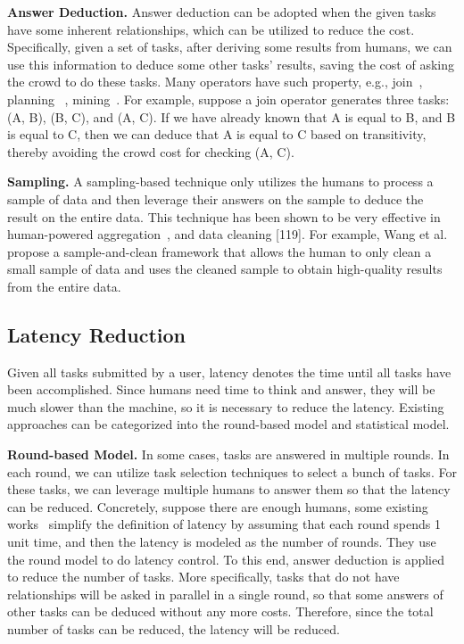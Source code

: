  
\textbf{Answer Deduction.}%
Answer deduction can be adopted when the given tasks have some inherent relationships, which can be utilized to  reduce the cost. Specifically, given a set of tasks, after deriving some  results from  humans, we can use this information to deduce some other tasks’ results, saving the cost of asking the crowd to do these tasks. Many operators have such property, e.g., join~\cite{DBLP:transitivity, DBLP:journals/vldb/ChaiLLDF18, DBLP:conf/sigmod/ChaiLLDF16}, planning ~\cite{DBLP:journals/pvldb/KaplanLMN13, DBLP:journals/pvldb/ZhangTC14}, mining~\cite{DBLP:conf/sigmod/AmsterdamerDMNS14}. For example, suppose a  join operator generates three tasks: (A, B), (B, C), and (A, C). If we have already known that A is equal to B, and B is equal to C, then we can deduce that A is equal to C based on transitivity, thereby avoiding the crowd cost for checking (A, C).


 
\textbf{Sampling.}
A sampling-based technique only utilizes the humans to process a sample of data and then leverage their answers on the sample to deduce the result on the entire data. This technique has been shown to be very effective in human-powered aggregation~\cite{DBLP:journals/pvldb/0002KMMO12}, and data cleaning [119]. For example, Wang et al.~\cite{DBLP:conf/sigmod/WangKFGKM14} propose a sample-and-clean framework that allows the human to only clean a small sample of data and uses the cleaned sample to obtain high-quality results from the entire data.



\subsection{Latency Reduction}\label{subsec:latency}
Given all tasks submitted by a user, latency denotes the time until all tasks have been accomplished.   Since humans need time to think and answer, they will be much slower than the machine, so it is necessary to reduce the latency. Existing approaches can be categorized into the round-based model and statistical model.

\textbf{Round-based Model.}
In some cases, tasks are answered in multiple rounds. In each round, we can utilize task selection techniques to select a bunch of tasks. For these tasks, we can leverage multiple humans to answer them so that the latency can be reduced. Concretely, suppose there are enough humans, some existing works~\cite{DBLP:conf/icde/SarmaPGH14, DBLP:conf/sigmod/VerroiosLG15} simplify the definition of latency by assuming that each round spends 1 unit time, and then the latency is modeled as the number of rounds. They use the round model to do latency control. To this end, answer deduction is applied to reduce the number of tasks. More specifically, tasks that do not have relationships will be asked in parallel in a single round, so that some answers of other tasks can be deduced without any more costs. Therefore, since the total number of tasks can be reduced, the latency will be reduced.




